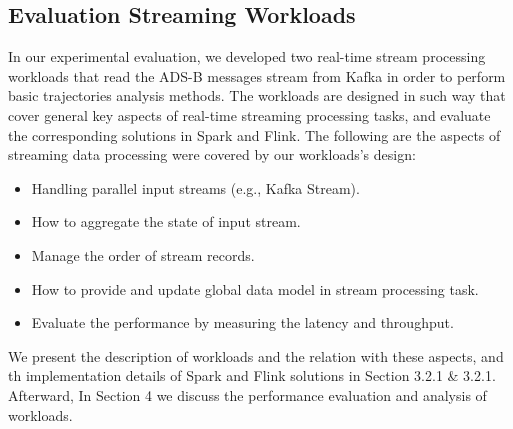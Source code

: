 \documentclass[]{article}
\begin{document}
\subsection{Evaluation Streaming Workloads}
In our experimental evaluation, we developed two real-time stream processing workloads that read the ADS-B messages stream from Kafka in order to perform basic trajectories analysis methods. The workloads are designed in such way that cover general key aspects of real-time streaming processing tasks, and evaluate the corresponding solutions in Spark and Flink. The following are the aspects of streaming data processing were covered by our workloads's design: 

\begin{itemize}
\item Handling parallel input streams (e.g., Kafka Stream).
\item How to aggregate the state of input stream.
\item Manage the order of stream records.
\item How to provide and update global data model in stream processing task.
\item Evaluate the performance by measuring  the latency and throughput.
\end{itemize}
We present the description of workloads and the relation with these aspects, and th implementation details of Spark and Flink solutions in Section 3.2.1 \& 3.2.1. Afterward, In Section 4 we discuss the performance evaluation and analysis of workloads.
\end{document}
